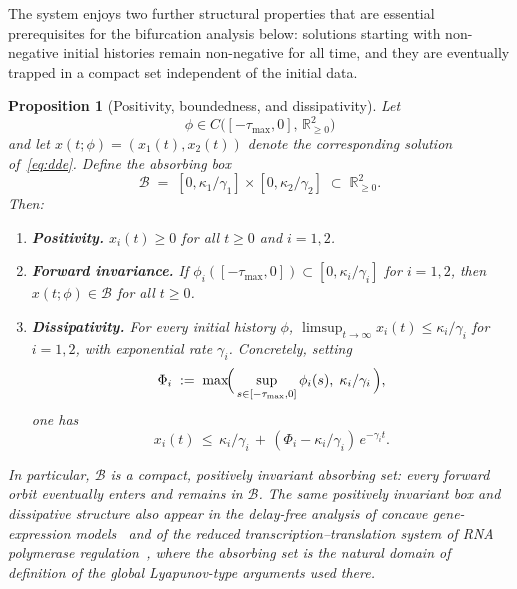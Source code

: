 \documentclass[sn-mathphys,Numbered]{sn-jnl}
\theoremstyle{thmstyleone}
\newtheorem{proposition}[theorem]{Proposition}
\theoremstyle{thmstyletwo}
\theoremstyle{thmstylethree}
\begin{document}
The system enjoys two further structural properties that are essential
prerequisites for the bifurcation analysis below: solutions starting
with non-negative initial histories remain non-negative for all time,
and they are eventually trapped in a compact set independent of the
initial data.

\begin{proposition}[Positivity, boundedness, and dissipativity]
\label{prop:dissipative}
Let
\[
\phi\in C\bigl([-\tau_{\max},0],\,\mathbb{R}_{\geq 0}^2\bigr)
\]
and let $x(t;\phi)=(x_1(t),x_2(t))$ denote the corresponding solution
of~\eqref{eq:dde}. Define the absorbing box
\begin{equation}
\mathcal{B} \;=\; [0,\kappa_1/\gamma_1]\times [0,\kappa_2/\gamma_2]
\;\subset\; \mathbb{R}_{\geq 0}^2.
\label{eq:absorbing_box}
\end{equation}
Then:
\begin{enumerate}
  \item \textbf{Positivity.} $x_i(t)\geq 0$ for all $t\geq 0$ and $i=1,2$.
  \item \textbf{Forward invariance.} If
        $\phi_i([-\tau_{\max},0])\subset[0,\kappa_i/\gamma_i]$ for
        $i=1,2$, then $x(t;\phi)\in\mathcal{B}$ for all $t\geq 0$.
  \item \textbf{Dissipativity.} For every initial history $\phi$,
        $\limsup_{t\to\infty} x_i(t)\leq \kappa_i/\gamma_i$ for $i=1,2$,
        with exponential rate $\gamma_i$. Concretely, setting
        \[
        \Phi_i \;:=\; \max\!\Bigl(\,
            \sup_{s\in[-\tau_{\max},0]}\phi_i(s),\;
            \kappa_i/\gamma_i\,\Bigr),
        \]
        one has
        \begin{equation}
        x_i(t) \,\leq\, \kappa_i/\gamma_i
        \,+\, (\Phi_i-\kappa_i/\gamma_i)\,e^{-\gamma_i t}.
        \label{eq:dissipative_explicit}
        \end{equation}
\end{enumerate}
In particular, $\mathcal{B}$ is a compact, positively invariant absorbing
set: every forward orbit eventually enters and remains in $\mathcal{B}$.
The same positively invariant box and dissipative structure also appear
in the delay-free analysis of concave gene-expression
models~\cite{belgacem2014mathematical} and of the reduced
transcription--translation system of RNA polymerase
regulation~\cite{belgacem2018reduction}, where the absorbing set is the
natural domain of definition of the global Lyapunov-type arguments used
there.
\end{proposition}
\end{document}
